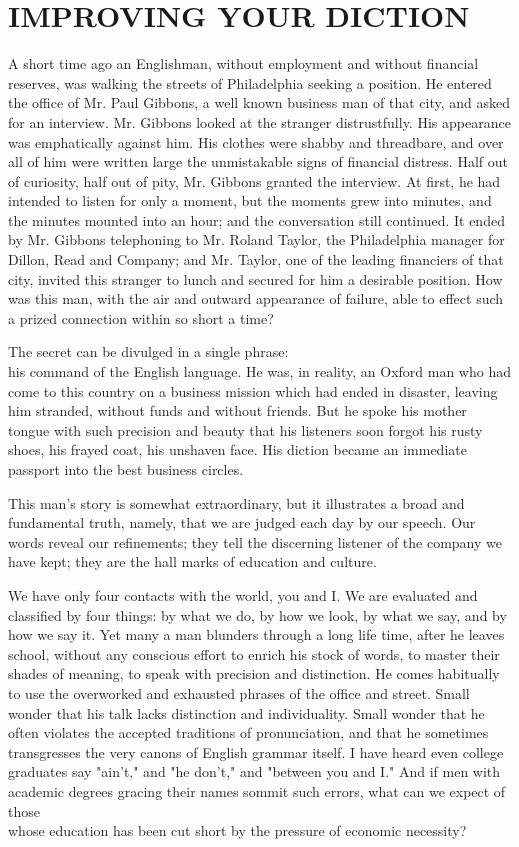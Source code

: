 \documentclass[10pt]{article}
\begin{document}
\section*{IMPROVING YOUR DICTION}
A short time ago an Englishman, without employment and without financial reserves, was walking the streets of Philadelphia seeking a position. He entered the office of Mr. Paul Gibbons, a well known business man of that city, and asked for an interview. Mr. Gibbons looked at the stranger distrustfully. His appearance was emphatically against him. His clothes were shabby and threadbare, and over all of him were written large the unmistakable signs of financial distress. Half out of curiosity, half out of pity, Mr. Gibbons granted the interview. At first, he had intended to listen for only a moment, but the moments grew into minutes, and the minutes mounted into an hour; and the conversation still continued. It ended by Mr. Gibbons telephoning to Mr. Roland Taylor, the Philadelphia manager for Dillon, Read and Company; and Mr. Taylor, one of the leading financiers of that city, invited this stranger to lunch and secured for him a desirable position. How was this man, with the air and outward appearance of failure, able to effect such a prized connection within so short a time?

The secret can be divulged in a single phrase:\\
his command of the English language. He was, in reality, an Oxford man who had come to this country on a business mission which had ended in disaster, leaving him stranded, without funds and without friends. But he spoke his mother tongue with such precision and beauty that his listeners soon forgot his rusty shoes, his frayed coat, his unshaven face. His diction became an immediate passport into the best business circles.

This man's story is somewhat extraordinary, but it illustrates a broad and fundamental truth, namely, that we are judged each day by our speech. Our words reveal our refinements; they tell the discerning listener of the company we have kept; they are the hall marks of education and culture.

We have only four contacts with the world, you and I. We are evaluated and classified by four things: by what we do, by how we look, by what we say, and by how we say it. Yet many a man blunders through a long life time, after he leaves school, without any conscious effort to enrich his stock of words, to master their shades of meaning, to speak with precision and distinction. He comes habitually to use the overworked and exhausted phrases of the office and street. Small wonder that his talk lacks distinction and individuality. Small wonder that he often violates the accepted traditions of pronunciation, and that he sometimes transgresses the very canons of English grammar itself. I have heard even college graduates say "ain't," and "he don't," and "between you and I." And if men with academic degrees gracing their names sommit such errors, what can we expect of those\\
whose education has been cut short by the pressure of economic necessity?
\end{document}
